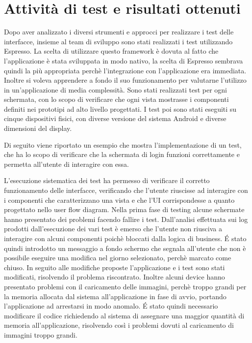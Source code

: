 \documentclass[12pt]{report}
\begin{document}
\section{Attività di test e risultati ottenuti}
Dopo aver analizzato i diversi strumenti e approcci per realizzare i test delle interfacce, insieme al team di sviluppo sono stati realizzati i test utilizzando Espresso. La scelta di utilizzare questo framework è dovuta al fatto che l'applicazione è stata sviluppata in modo nativo, la scelta di Espresso sembrava quindi la più appropriata perchè l'integrazione con l'applicazione era immediata. Inoltre si voleva apprendere a fondo il suo funzionamento per valutarne l'utilizzo in un'applicazione di media complessità. Sono stati realizzati test per ogni schermata, con lo scopo di verificare che ogni vista mostrasse i componenti definiti nei prototipi ad alto livello progettati. I test poi sono stati eseguiti su cinque dispositivi fisici, con diverse versione del sistema Android e diverse dimensioni del display. 

\newpage
Di seguito viene riportato un esempio che mostra l'implementazione di un test, che ha lo scopo di verificare che la schermata di login funzioni correttamente e permetta all'utente di interagire con essa.

L'esecuzione sistematica dei test ha permesso di verificare il corretto funzionamento delle interfacce, verificando che l'utente riuscisse ad interagire con i componenti che caratterizzano una vista e che l'UI corrispondesse a quanto progettato nello user flow diagram. Nella prima fase di testing alcune schermate hanno presentato dei problemi facendo fallire i test. Dall'analisi effettuata sui log prodotti dall'esecuzione dei vari test è emerso che l'utente non riusciva a interagire con alcuni componenti poichè bloccati dalla logica di business. É stato quindi introdotto un messaggio a fondo schermo che segnala all'utente che non è possibile eseguire una modifica nel giorno selezionato, perchè marcato come chiuso. In seguito alle modifiche proposte l'applicazione e i test sono stati modificati, risolvendo il problema riscontrato. Inoltre alcuni device hanno presentato problemi con il caricamento delle immagini, perchè troppo grandi per la memoria allocata dal sistema all'applicazione in fase di avvio, portando l'applicazione ad arrestarsi in modo anomalo. É stato quindi necessario modificare il codice richiedendo al sistema di assegnare una maggior quantità di memoria all'applicazione, risolvendo così i problemi dovuti al caricamento di immagini troppo grandi.
%
\end{document}
